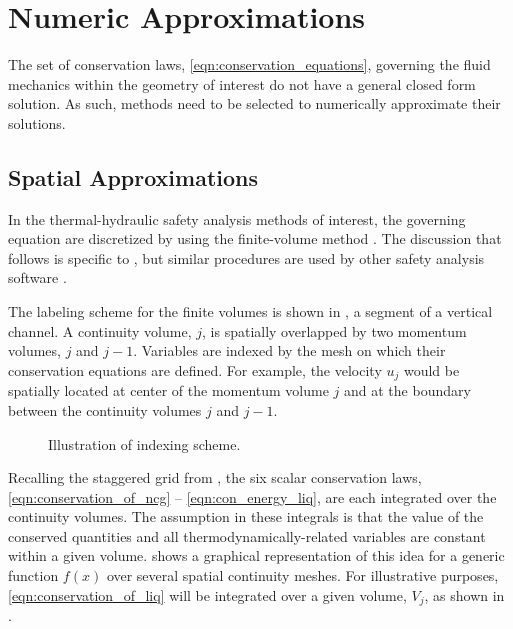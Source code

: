 \section{Numeric Approximations}
\label{sect:numeric_approximation}
The set of conservation laws, \eqref{eqn:conservation_equations}, governing the fluid mechanics within the geometry of interest do not have a general closed form solution.
As such, methods need to be selected to numerically approximate their solutions.

\subsection{Spatial Approximations}
\label{subsect:spatial_approx}
In the thermal-hydraulic safety analysis methods of interest, the governing equation are discretized by using the finite-volume method \cite{LeVeque2002}.
The discussion that follows is specific to \cobra{}, but similar procedures are used by other safety analysis software \cite{RELAP,TRACE}.

The labeling scheme for the finite volumes is shown in , a segment of a vertical channel.
A continuity volume, $j$, is spatially overlapped by two momentum volumes, $j$ and $j-1$.
Variables are indexed by the mesh on which their conservation equations are defined.
For example, the velocity $u_j$ would be spatially located at center of the momentum volume $j$ and at the boundary between the continuity volumes $j$ and $j-1$.

\begin{figure}[ht]
\begin{center}
\end{center}
\caption{Illustration of indexing scheme.}
\label{fig:vertical_pipe_with_cells}
\end{figure}

Recalling the staggered grid from , the six scalar conservation laws, \eqref{eqn:conservation_of_ncg} -- \eqref{eqn:con_energy_liq}, are each integrated over the continuity volumes.
The assumption in these integrals is that the value of the conserved quantities and all thermodynamically-related variables are constant within a given volume.
 shows a graphical representation of this idea for a generic function $f(x)$ over several spatial continuity meshes. For illustrative purposes, \eqref{eqn:conservation_of_liq} will be integrated over a given volume, $V_j$, as shown in .


